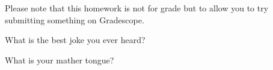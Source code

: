\documentclass[addpoints]{exam}
\begin{document}
  \pagestyle{headandfoot}
  \runningheadrule

  \firstpagefooter{}{}{}
  \runningfooter{}{}{}
  \begin{flushright}

    \vspace{0.2in}
  \end{flushright}

  \begin{questions}
    \begin{EnvFullwidth}
      Please note that this homework is not for grade but to allow you to
			try submitting something on Gradescope.
    \end{EnvFullwidth}
    \question[10]
      What is the best joke you ever heard?

      \begin{solution}[\stretch{1}]
      \end{solution}
      \newpage
    \question[10]
      What is your mather tongue?

      \begin{solution}[\stretch{1}]
      \end{solution}
      \newpage
  \end{questions}
\end{document}
